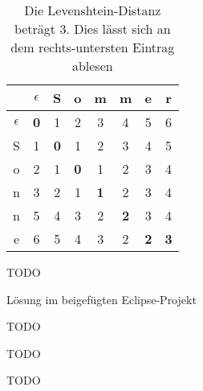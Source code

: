 \documentclass[12pt]{scrartcl}
\begin{document}

\exercise{}
\begin{table}[h!]
\begin{center}
\begin{tabular}{c|c|c|c|c|c|c|c}
& $\epsilon$ & S & o & m & m & e & r\\
\hline
$\epsilon$ & \textbf{0} & 1 & 2 & 3 & 4 & 5 & 6\\
\hline
S & 1 & \textbf{0} & 1 & 2 & 3 & 4 & 5\\
\hline
o & 2 & 1 & \textbf{0} & 1 & 2 & 3 & 4\\
\hline
n & 3 & 2 & 1 & \textbf{1} & 2 & 3 & 4\\
\hline
n & 5 & 4 & 3 & 2 & \textbf{2} & 3 & 4\\
\hline
e & 6 & 5 & 4 & 3 & 2 & \textbf{2} & \textbf{3}\\
\hline
\end{tabular}
\end{center}
\caption{Die Levenshtein-Distanz beträgt 3. Dies lässt sich an dem rechts-untersten Eintrag ablesen}
\end{table}

\exercise{}
TODO

\exercise{}
Lösung im beigefügten Eclipse-Projekt

\exercise{}
TODO

\exercise{}
TODO

\exercise{}
TODO



\end{document}
